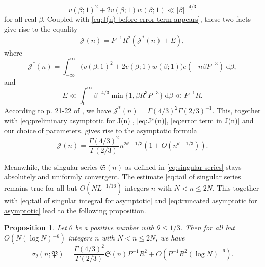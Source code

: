 \documentclass[12pt,english,reqno]{amsart}
\theoremstyle{definition}
\theoremstyle{remark}
\numberwithin{equation}{section}
\numberwithin{equation}{section}
\numberwithin{figure}{section}
\theoremstyle{plain}
\theoremstyle{plain}
\newtheorem{prop}[thm]{Proposition}
\theoremstyle{plain}
\theoremstyle{plain}
\numberwithin{equation}{section}
\numberwithin{thm}{section}
\begin{document}
\[
v(\beta;1)^2+2v(\beta;1)w(\beta;1)\ll|\beta|^{-4/3}\]
for all real $\beta$. Coupled with \eqref{eq:J(n) before error term appears}, these two facts give rise to the equality
\begin{equation}
\mathcal{J}(n)=P^{-1}R^2(\mathcal{J}^*(n)+E),\label{eq:preliminary asymptotic for J(n)}\end{equation}
where
\begin{equation}
\mathcal{J}^*(n)=\int_{-\infty}^{\infty}\Big(v(\beta;1)^2+2v(\beta;1)w(\beta;1)\Big)e(-n\beta P^{-3})\;\mathrm{d}\beta,\label{eq:J*(n)}\end{equation}
and
\begin{equation}
E\ll\int_{0}^{\infty}\beta^{-4/3}\min\{1,\beta R^3P^{-3}\}\;\mathrm{d}\beta\ll P^{-1}R.\label{eq:error term in J(n)}\end{equation}
According to p. 21-22 of \cite{davenport2005}, we have $\mathcal{J}^*(n)=\Gamma(4/3)^{2}\Gamma(2/3)^{-1}$. This, together with \eqref{eq:preliminary asymptotic for J(n)}, \eqref{eq:J*(n)}, \eqref{eq:error term in J(n)} and our choice of parameters, gives rise to the asymptotic formula
\[
\mathcal{J}(n)=\frac{\Gamma(4/3)^{2}}{\Gamma(2/3)}n^{2\theta-1/3}(1+O(n^{\theta-1/3})).\]
\par Meanwhile, the singular series $\mathfrak{S}(n)$ as defined in \eqref{eq:singular series}
stays absolutely and uniformly convergent. The estimate \eqref{eq:tail of singular series}
remains true for all but $O(NL^{-1/16})$ integers $n$ with $N<n\leq2N$. This together with
\eqref{eq:tail of singular integral for asymptotic} and \eqref{eq:truncated asymptotic for asymptotic}
lead to the following proposition.
\begin{prop}
\label{pro:major arc estimate for asymptotic}Let $\theta$ be a positive
number with $\theta\leq1/3$. Then for all but $O(N(\log N){}^{-6})$
integers $n$ with $N<n\leq2N$, we have
\begin{equation}
\sigma_{\theta}(n;\mathfrak{P})=\frac{\Gamma(4/3)^{2}}{\Gamma(2/3)}\mathfrak{S}(n)P^{-1}R^{2}+O(P^{-1}R^{2}(\log N)^{-6}).\label{eq:major arc estimate for asymptotic}\end{equation}
\end{prop}
\end{document}
